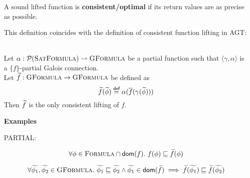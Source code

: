 \begin{definition}
    A sound lifted function is \textbf{consistent/optimal} if its return values are as precise as possible.
\end{definition}

This definition coincides with the definition of consistent function lifting in AGT:

\begin{lemma}\label{lemma:consistent-func-lifting-direct}~\\
    Let $\alpha : \mathcal{P}(\textsc{SatFormula}) \rightharpoonup \textsc{GFormula}$ be a partial function such that $\langle \gamma, \alpha \rangle$ is a $\{ f \}$-partial Galois connection.\\ 
    Let $\widetilde{f} : \textsc{GFormula} \rightarrow \textsc{GFormula}$ be defined as
    \begin{displaymath}
    \widetilde{f}(\widetilde{\phi}) \overset{\textsf{def}}{=} \alpha(\overline{f}(\gamma(\widetilde{\phi})))
    \end{displaymath}
    Then $\widetilde{f}$ is the only consistent lifting of $f$.
\end{lemma} %


\textbf{Examples}






PARTIAL:

\begin{displaymath}
\forall \phi \in \textsc{Formula} \cap \textsf{dom}(f).~ f(\phi) \sqsubseteq \widetilde{f}(\phi)
\end{displaymath}

\begin{displaymath}
\forall \widetilde{\phi_1}, \widetilde{\phi_2} \in \textsc{GFormula}.~ \widetilde{\phi_1} \sqsubseteq \widetilde{\phi_2} \wedge \widetilde{\phi_1} \in \textsf{dom}(\widetilde{f}) \implies \widetilde{f}(\widetilde{\phi_1}) \sqsubseteq \widetilde{f}(\widetilde{\phi_2})
\end{displaymath}



